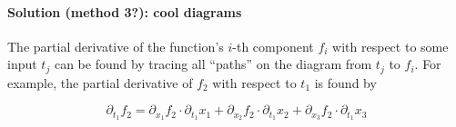 \documentclass{multi}
\begin{document}
\paragraph{Solution (method 3?): cool diagrams}

\begin{center}
    \begin{tikzpicture}
        
    \end{tikzpicture}
\end{center}

The partial derivative of the function's \(i\)-th component \(f_i\) with respect to some input \(t_j\) can be found by tracing all ``paths'' on the diagram from \(t_j\) to \(f_i\). For example, the partial derivative of \(f_2\) with respect to \(t_1\) is found by
\begin{center}
\end{center}
\[
    \partial_{t_1} f_2 = \partial_{x_1} f_2 \cdot \partial_{t_1} x_1 +
                         \partial_{x_2} f_2 \cdot \partial_{t_1} x_2 +
                         \partial_{x_3} f_2 \cdot \partial_{t_1} x_3
\]
\end{document}
